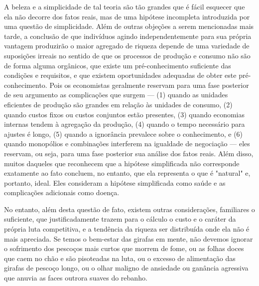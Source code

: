 \documentclass[12pt]{article}
\begin{document}
A beleza e a simplicidade de tal teoria são tão grandes que é fácil esquecer que ela não decorre dos fatos reais, mas de uma hipótese incompleta introduzida por uma questão de simplicidade. Além de outras objeções a serem mencionadas mais tarde, a conclusão de que indivíduos agindo independentemente para sua própria vantagem produzirão o maior agregado de riqueza depende de uma variedade de suposições irreais no sentido de que os processos de produção e consumo não são de forma alguma orgânicos, que existe um pré-conhecimento suficiente das condições e requisitos, e que existem oportunidades adequadas de obter este pré-conhecimento. Pois os economistas geralmente reservam para uma fase posterior de seu argumento as complicações que surgem — (1) quando as unidades eficientes de produção são grandes em relação às unidades de consumo, (2) quando custos fixos ou custos conjuntos estão presentes, (3) quando economias internas tendem à agregação da produção, (4) quando o tempo necessário para ajustes é longo, (5) quando a ignorância prevalece sobre o conhecimento, e (6) quando monopólios e combinações interferem na igualdade de negociação — eles reservam, ou seja, para uma fase posterior sua análise dos fatos reais. Além disso, muitos daqueles que reconhecem que a hipótese simplificada não corresponde exatamente ao fato concluem, no entanto, que ela representa o que é "natural" e, portanto, ideal. Eles consideram a hipótese simplificada como saúde e as complicações adicionais como doença.

No entanto, além desta questão de fato, existem outras considerações, familiares o suficiente, que justificadamente trazem para o cálculo o custo e o caráter da própria luta competitiva, e a tendência da riqueza ser distribuída onde ela não é mais apreciada. Se temos o bem-estar das girafas em mente, não devemos ignorar o sofrimento dos pescoços mais curtos que morrem de fome, ou as folhas doces que caem no chão e são pisoteadas na luta, ou o excesso de alimentação das girafas de pescoço longo, ou o olhar maligno de ansiedade ou ganância agressiva que anuvia as faces outrora suaves do rebanho.
\end{document}
